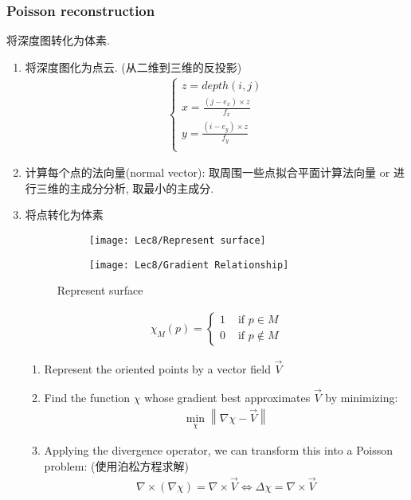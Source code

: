 \subsubsection{Poisson reconstruction}
将深度图转化为体素. 
\begin{enumerate}
    \item 将深度图化为点云. (从二维到三维的反投影)
    \begin{align*}
        \left\{ \begin{array}{l}
            z=depth(i,j)\\
            x=\frac{(j-e_x)\times z}{f_x}\\
            y=\frac{(i-e_y)\times z}{f_y}\\
        \end{array} \right.
    \end{align*}

    \item 计算每个点的法向量(normal vector): 取周围一些点拟合平面计算法向量 or 进行三维的主成分分析, 取最小的主成分. 
    \item 将点转化为体素

    \begin{figure}[H]
        \centering
        \begin{subfigure}{0.48\textwidth}
            \centering
            \texttt{[image: Lec8/Represent surface]}
        \end{subfigure}
        \begin{subfigure}{0.48\textwidth}
            \centering
            \texttt{[image: Lec8/Gradient Relationship]}
        \end{subfigure}
        \caption{Represent surface}
    \end{figure}
    
    \begin{align*}
        \chi_{M}(p)=\left\{\begin{array}{ll}
            1 & \text { if } p \in M \\
            0 & \text { if } p \notin M
        \end{array}\right.
    \end{align*}

    \begin{enumerate}
        \item Represent the oriented points by a vector field $\vec{V}$
        \item Find the function $\chi$ whose gradient best approximates $\vec{V}$ by minimizing: 
        \begin{align*}
            \min_{\chi} \left\| \nabla \chi -\vec{V} \right\|
        \end{align*}
        \item Applying the divergence operator, we can transform this into a Poisson problem: (使用泊松方程求解)
        \begin{align*}
            \nabla \times (\nabla \chi) = \nabla \times \vec{V} \Longleftrightarrow \Delta \chi =\nabla \times \vec{V}
        \end{align*}
    \end{enumerate}
    
\end{enumerate}

